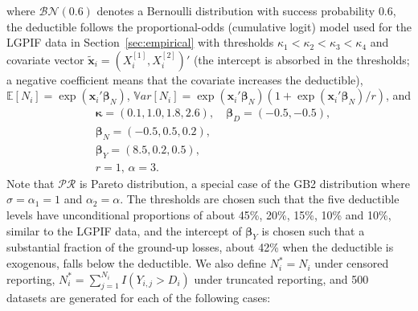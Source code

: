 \documentclass[11pt]{article}
\newcommand{\rev}[1]{{\color{blue}#1}}
\begin{document}
where \rev{$\mathcal{BN}(0.6)$ denotes a Bernoulli distribution with success probability $0.6$,} \rev{the deductible follows the proportional-odds (cumulative logit) model used for the LGPIF data in Section~\ref{sec:empirical} with thresholds $\kappa_1<\kappa_2<\kappa_3<\kappa_4$ and covariate vector $\tilde{\bm{x}}_i=(X^{[1]}_{i}, X^{[2]}_{i})'$ (the intercept is absorbed in the thresholds; a negative coefficient means that the covariate increases the deductible),} $\mathbb{E}[N_i]=\exp(\bm{x}_i'\bm{\beta}_N)$, \rev{$\mathbb{V}ar[N_i]= \exp(\bm{x}_i'\bm{\beta}_N) \left(1+\exp(\bm{x}_i'\bm{\beta}_N)/r\right)$}, and
{\color{blue}
$$
\begin{aligned}
&\bm{\kappa} = (0.1, 1.0, 1.8, 2.6), \quad \bm{\beta}_D = (-0.5, -0.5), \\
&\bm{\beta}_N = (-0.5, 0.5, 0.2),\\
&\bm{\beta}_Y = (8.5, 0.2, 0.5), \\
& r=1, \, \alpha= 3.
\end{aligned}
$$
}
Note that $\mathcal{PR}$ is Pareto distribution, a special case of the GB2 distribution where $\sigma=\alpha_1=1$ and $\alpha_2=\alpha$. \rev{The thresholds are chosen such that the five deductible levels have unconditional proportions of about 45\%, 20\%, 15\%, 10\% and 10\%, similar to the LGPIF data, and the intercept of $\bm{\beta}_Y$ is chosen such that a substantial fraction of the ground-up losses, about 42\% when the deductible is exogenous, falls below the deductible.} We also define $N^*_i ={N_i}$ under censored reporting, $N^*_i =\sum_{j=1}^{N_i} I(Y_{i,j}>D_i)$ under truncated reporting\rev{, and 500 datasets are generated for each of the following cases}:
\end{document}
